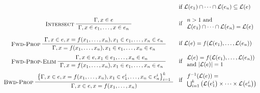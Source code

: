 \begin{table}
\begin{gather*}
\begin{array}{@{}cl@{}}
      &
        \text{if~} \lang{e_1} \cap \cdots \cap\lang{e_n} \subseteq \lang{e}
      \\[2.5ex]
      \infer[Intersect]
      {\seqq{x \in e_1, \ldots, x \in e_n}}
      {\seqq{x \in e}}
      &
        \text{if~}
        \begin{array}{l}
          n > 1 \text{~and~}
          \\
          \lang{e_1} \cap \cdots \cap\lang{e_n} = \lang{e}
        \end{array}
      \\[4ex]
      \infer[Fwd-Prop]
      {\seqq{x = f(x_1, \ldots, x_n), x_1 \in e_1, \ldots, x_n \in e_n}}
      {\seqq{x \in e, x = f(x_1, \ldots, x_n), x_1 \in e_1, \ldots, x_n \in e_n}}
      &
        \text{if~} \lang{e} = f(\lang{e_1}, \ldots, \lang{e_n})
      \\[3ex]
      \infer[Fwd-Prop-Elim]
      {\seqq{x = f(x_1, \ldots, x_n), x_1 \in e_1, \ldots, x_n \in e_n}}
      {\seqq{x \in e, x_1 \in e_1, \ldots, x_n \in e_n}}
      &
        \text{if~}
        \begin{array}{l}
          \lang{e} = f(\lang{e_1}, \ldots, \lang{e_n})
          \\
          \text{and~} 
          |\lang{e}|= 1
          \end{array}
      \\[3ex]
      \infer[Bwd-Prop]
      {\seqq{x \in e, x = f(x_1, \ldots, x_n)}}
      {\big\{\seqq{x \in e, x = f(x_1, \ldots, x_n),
      x_1 \in e_1^i, \ldots, x_n \in e_n^i}\big\}_{i=1}^k}
      &
        \text{if~}
        \begin{array}{l}
          f^{-1}(\lang{e}) = \\
          \bigcup_{i=1}^k \big( \lang{e_1^i} \times \cdots \times \lang{e_n^i} \big)
          \end{array}
    \end{array}
  \end{gather*}
\end{table}

